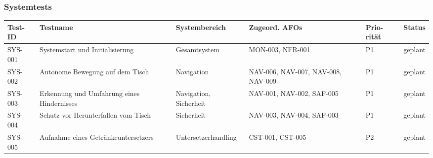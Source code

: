 \documentclass[
  a4paper,
  12pt,
  DIV=12,        %
  parskip=half,  %
  headings=small %
]{scrartcl}
\theoremstyle{definition}
\theoremstyle{definition}
\begin{document}
\newpage

\begin{landscape}
\subsubsection{Systemtests}\label{systemtests-2}

\begin{longtable}[]{@{}
  >{\raggedright\arraybackslash}p{}
  >{\raggedright\arraybackslash}p{}
  >{\raggedright\arraybackslash}p{}
  >{\raggedright\arraybackslash}p{}
  >{\raggedright\arraybackslash}p{}
  >{\raggedright\arraybackslash}p{}@{}}
\toprule\noalign{}
\begin{minipage}[b]{\linewidth}\raggedright
Test-ID
\end{minipage} & \begin{minipage}[b]{\linewidth}\raggedright
Testname
\end{minipage} & \begin{minipage}[b]{\linewidth}\raggedright
Systembereich
\end{minipage} & \begin{minipage}[b]{\linewidth}\raggedright
Zugeord. AFOs
\end{minipage} & \begin{minipage}[b]{\linewidth}\raggedright
Prio-rität
\end{minipage} & \begin{minipage}[b]{\linewidth}\raggedright
Status
\end{minipage} \\
\midrule\noalign{}
\endhead
\bottomrule\noalign{}
\endlastfoot
SYS-001 & Systemstart und Initialisierung & Gesamtsystem & MON-003,
NFR-001 & P1 & geplant \\
SYS-002 & Autonome Bewegung auf dem Tisch & Navigation & NAV-006,
NAV-007, NAV-008, NAV-009 & P1 & geplant \\
SYS-003 & Erkennung und Umfahrung eines Hindernisses & Navigation,
Sicherheit & NAV-001, NAV-002, SAF-005 & P1 & geplant \\
SYS-004 & Schutz vor Herunterfallen vom Tisch & Sicherheit & NAV-003,
NAV-004, SAF-003 & P1 & geplant \\
SYS-005 & Aufnahme eines Getränkeuntersetzers & Untersetzerhandling &
CST-001, CST-005 & P2 & geplant \\

\end{longtable}
\end{landscape}
\end{document}
